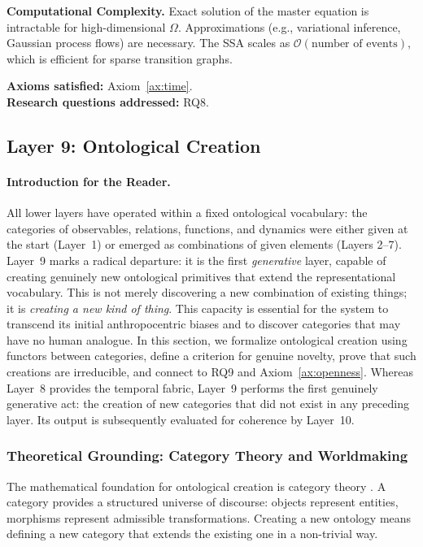 \textbf{Computational Complexity.} Exact solution of the master equation is intractable for high-dimensional $\Omega$. Approximations (e.g., variational inference, Gaussian process flows) are necessary. The SSA scales as $\mathcal{O}(\text{number of events})$, which is efficient for sparse transition graphs.

\textbf{Axioms satisfied:} Axiom~\ref{ax:time}. \\
\textbf{Research questions addressed:} RQ8.

\subsection{Layer 9: Ontological Creation}
\label{subsec:layer9}

\paragraph{Introduction for the Reader.}
All lower layers have operated within a fixed ontological vocabulary: the categories of observables, relations, functions, and dynamics were either given at the start (Layer~1) or emerged as combinations of given elements (Layers 2--7). Layer~9 marks a radical departure: it is the first \emph{generative} layer, capable of creating genuinely new ontological primitives that extend the representational vocabulary. This is not merely discovering a new combination of existing things; it is \emph{creating a new kind of thing}. This capacity is essential for the system to transcend its initial anthropocentric biases and to discover categories that may have no human analogue. In this section, we formalize ontological creation using functors between categories, define a criterion for genuine novelty, prove that such creations are irreducible, and connect to RQ9 and Axiom~\ref{ax:openness}.
Whereas Layer~8 provides the temporal fabric, Layer~9 performs the first genuinely generative act: the creation of new categories that did not exist in any preceding layer. Its output is subsequently evaluated for coherence by Layer~10.

\subsubsection{Theoretical Grounding: Category Theory and Worldmaking}
The mathematical foundation for ontological creation is category theory \cite{maclane1971}. A category provides a structured universe of discourse: objects represent entities, morphisms represent admissible transformations. Creating a new ontology means defining a new category that extends the existing one in a non-trivial way.

